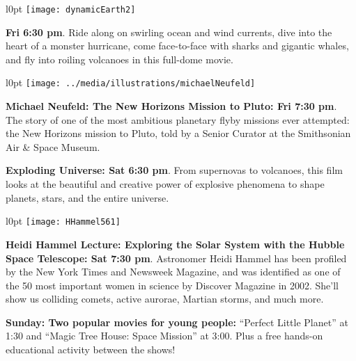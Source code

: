 \documentclass{article}
\begin{document}
   {\fontsize{19}{19}

     \begin{wrapfigure}[5]{l}{0pt}
       \texttt{[image: dynamicEarth2]}
     \end{wrapfigure}      
     
      \textbf{Fri 6:30 pm}. Ride along on swirling ocean and wind currents, dive into the heart of a monster hurricane, come face-to-face with sharks and gigantic whales, and fly into roiling volcanoes in this full-dome movie.


\medskip

   \begin{wrapfigure}[6]{l}{0pt}
      \texttt{[image: ../media/illustrations/michaelNeufeld]}
   \end{wrapfigure}      
   
   \textbf{Michael Neufeld: The New Horizons Mission to Pluto: Fri 7:30 pm}. 
      The story of one of the most ambitious planetary flyby missions ever attempted: the New Horizons mission to Pluto,
      told by a Senior Curator at the Smithsonian Air \& Space Museum.
      



\medskip

     \textbf{Exploding Universe: Sat 6:30 pm}. From supernovas to volcanoes, this film looks at the beautiful and creative power of explosive phenomena to shape planets, stars, and the entire universe.


\medskip

 \begin{wrapfigure}[6]{l}{0pt}
   \texttt{[image: HHammel561]}
 \end{wrapfigure}      

   \textbf{Heidi Hammel Lecture: Exploring the Solar System with the Hubble Space Telescope: Sat 7:30 pm}. 
Astronomer Heidi Hammel has been profiled by the New York Times and Newsweek Magazine, and was identified as one of the 50 most important women in science by Discover Magazine in 2002. She’ll show us colliding comets, active aurorae, Martian storms, and much more.

\medskip

\textbf{Sunday: Two popular movies for young people:} “Perfect Little Planet” at 1:30 and “Magic Tree House: 
Space Mission” at 3:00. Plus a free hands-on educational activity between the shows!

}
\end{document}
